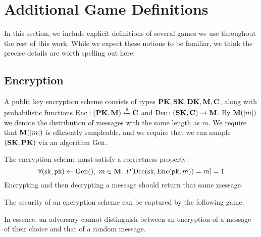 \section{Additional Game Definitions}

In this section, we include explicit definitions of several games we
use throughout the rest of this work.
While we expect these notions to be familiar, we think the precise
details are worth spelling out here.

\subsection{Encryption}
\label{app:encryption}
A public key encryption scheme consists of types $\textbf{PK}, \textbf{SK}, \textbf{DK}, \textbf{M}, \textbf{C}$,
along with probabilistic functions $\text{Enc} : (\textbf{PK}, \textbf{M}) \xleftarrow{\$} \textbf{C}$ and $\text{Dec} : (\textbf{SK}, \textbf{C}) \to \textbf{M}$.
By $\textbf{M}(|m|)$ we denote the distribution of messages with the same
length as $m$.
We require that $\textbf{M}(|m|)$ is efficiently sampleable,
and we require that we can sample $(\textbf{SK}, \textbf{PK})$ via an algorithm
$\text{Gen}$.

The encryption scheme must satisfy a correctness property:
$$
\forall (\text{sk}, \text{pk}) \gets \text{Gen}(),\ m \in \textbf{M}.\ P[\text{Dec}(\text{sk}, \text{Enc}(\text{pk}, m)) = m] = 1
$$
Encrypting and then decrypting a message should return that same message.

The security of an encryption scheme can be captured by the following game:

In essence, an adversary cannot distinguish between an encryption of a message
of their choice and that of a random message.

